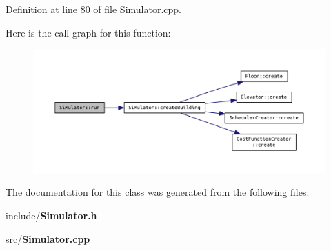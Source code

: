 Definition at line 80 of file Simulator.\+cpp.



Here is the call graph for this function\+:\nopagebreak
\begin{figure}[H]
\begin{center}
\leavevmode
\includegraphics[width=350pt]{class_simulator_aa2de7e32b04cc3e8fc60aec23997621b_cgraph}
\end{center}
\end{figure}




The documentation for this class was generated from the following files\+:\begin{DoxyCompactItemize}
\item 
include/{\bf Simulator.\+h}\item 
src/{\bf Simulator.\+cpp}\end{DoxyCompactItemize}
